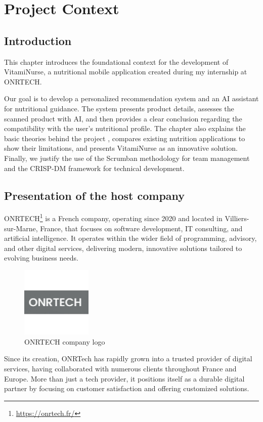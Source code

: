 \chapter{Project Context}
\section*{Introduction}
\par This chapter introduces the foundational context for the development of \mbox{VitamiNurse}, a nutritional mobile application created during my internship at ONRTECH. 

Our goal is to develop a personalized recommendation system and an AI assistant for nutritional guidance. The system presents product details, assesses the scanned product with AI, and then provides a clear conclusion regarding the compatibility with the user’s nutritional profile.
The chapter also explains the basic theories behind the project , compares existing nutrition applications to show their limitations, and presents VitamiNurse as an innovative solution. Finally, we justify the use of the Scrumban methodology for team management and the CRISP-DM framework for technical development.

\section{Presentation of the host company}
\par ONRTECH\footnote{\url{https://onrtech.fr/}} is a French company, operating since 2020 and located in Villiers-sur-Marne, France, that focuses on software development, IT consulting, and artificial intelligence. It operates within the wider field of programming, advisory, and other digital services, delivering modern, innovative solutions tailored to evolving business needs.

\begin{figure}[H]
    \centering
    \includegraphics[width=0.3\textwidth]{images/ONRTECH_logo.jpeg}
    \caption{ONRTECH company logo}
    \label{fig:onrtech_logo}
\end{figure}
\par Since its creation, ONRTech has rapidly grown into a trusted provider of digital services, having collaborated with numerous clients throughout France and Europe.  More than just a tech provider,  it positions itself as a durable digital partner by focusing on customer satisfaction and offering customized solutions.


